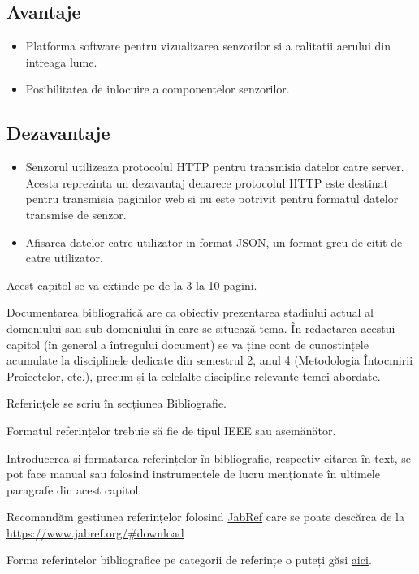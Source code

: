 \subsection{Avantaje}\label{subsec:sb_purpleair_avantaje}
\begin{itemize}
	\item Platforma software pentru vizualizarea senzorilor si a calitatii aerului din intreaga lume.
	\item Posibilitatea de inlocuire a componentelor senzorilor.
\end{itemize}
\subsection{Dezavantaje}\label{subsec:sb_purpleair_dezavantaje}
\begin{itemize}
	\item Senzorul utilizeaza protocolul HTTP pentru transmisia datelor catre server. Acesta reprezinta un dezavantaj deoarece protocolul HTTP este destinat 
	pentru transmisia paginilor web si nu este potrivit pentru formatul datelor transmise de senzor.
	\item Afisarea datelor catre utilizator in format JSON, un format greu de citit de catre utilizator.
\end{itemize}

{\color{blue}\noindent Acest capitol se va extinde pe de la 3 la 10 pagini.\\}

Documentarea bibliografică are ca obiectiv prezentarea stadiului actual al domeniului sau sub-domeniului în care se situează tema.
În redactarea acestui capitol (în general a întregului document) se va ține cont de cunoștințele acumulate la disciplinele dedicate din semestrul 2, anul 4
(Metodologia Întocmirii Proiectelor, etc.), precum și la celelalte discipline relevante temei abordate.


Referințele se scriu în secțiunea Bibliografie.

Formatul referințelor trebuie să fie de tipul IEEE sau asemănător.

Introducerea și formatarea referințelor în bibliografie, respectiv citarea în text, se pot face manual sau folosind instrumentele de lucru menționate în ultimele 
paragrafe din acest capitol.

Recomandăm gestiunea referințelor folosind \href{https://www.jabref.org/}{JabRef} care se poate descărca de la \url{https://www.jabref.org/#download}

Forma referințelor bibliografice pe categorii de referințe o puteți găsi \href{https://libguides.nps.edu/citation/ieee-bibtex}{aici}.

